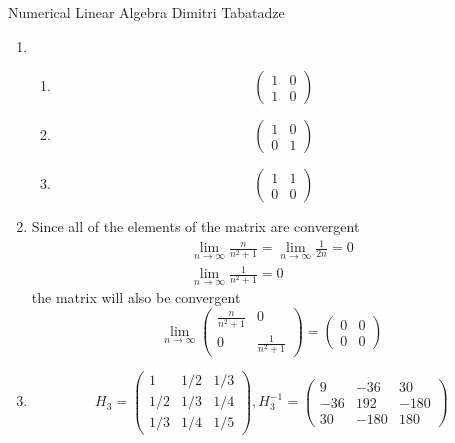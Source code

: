 \documentclass{article}
\newcommand*{\mat}[1]{\begin{pmatrix}#1\end{pmatrix}}
\begin{document}
    {Numerical Linear Algebra}
    {Dimitri Tabatadze}

    \begin{enumerate}
        \item {
            \begin{enumerate}
                \item {
                    \begin{displaymath}
                        \mat{1 & 0 \\ 1 & 0}
                    \end{displaymath}
                }
                \item {
                    \begin{displaymath}
                        \mat{1 & 0 \\ 0 & 1}
                    \end{displaymath}
                }
                \item {
                    \begin{displaymath}
                        \mat{1 & 1 \\ 0 & 0}
                    \end{displaymath}
                }
            \end{enumerate}
        }
        \item {
            Since all of the elements of the matrix are convergent
            \begin{gather*}
                \lim_{n\to\infty} \frac{n}{n^2+1} = \lim_{n\to\infty}\frac{1}{2n} = 0 \\
                \lim_{n\to\infty} \frac{1}{n^2+1} = 0
            \end{gather*}
            the matrix will also be convergent
            \begin{displaymath}
                \lim_{n\to\infty} \mat{\frac{n}{n^2+1} & 0 \\ 0 & \frac{1}{n^2+1}} = \mat{0 & 0 \\ 0 & 0}
            \end{displaymath}
        }
        \item {
            \begin{displaymath}
                H_3 = \mat{1 & 1/2 & 1/3 \\ 1/2 & 1/3 & 1/4 \\ 1/3 & 1/4 & 1/5}, H_3^{-1} = \mat{9 & -36 & 30 \\ -36 & 192 & -180 \\ 30 & -180 & 180}

\end{displaymath}}
\end{enumerate}
\end{document}

